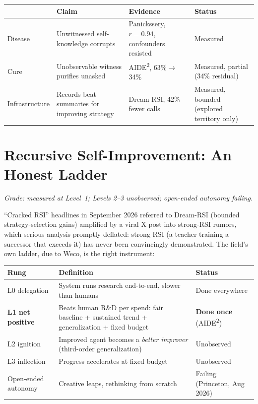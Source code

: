 \documentclass[11pt]{article}
\begin{document}
\begin{center}
\small
\begin{tabular}{p{2.2cm}p{3.8cm}p{3.8cm}p{2.6cm}}
\toprule
 & Claim & Evidence & Status \\
\midrule
Disease & Unwitnessed self-knowledge corrupts & Panickssery, $r=0.94$, confounders resisted & Measured \\
Cure & Unobservable witness purifies unasked & AIDE\textsuperscript{2}, 63\%$\to$34\% & Measured, partial (34\% residual) \\
Infrastructure & Records beat summaries for improving strategy & Dream-RSI, 42\% fewer calls & Measured, bounded (explored territory only) \\
\bottomrule
\end{tabular}
\end{center}

\section{Recursive Self-Improvement: An Honest Ladder}
\label{sec:rsi}

\textit{Grade: measured at Level~1; Levels 2--3 unobserved; open-ended autonomy failing.}

``Cracked RSI'' headlines in September 2026 referred to Dream-RSI (bounded strategy-selection gains) amplified by a viral X post into strong-RSI rumors, which serious analysis promptly deflated: strong RSI (a teacher training a successor that exceeds it) has never been convincingly demonstrated. The field's own ladder, due to Weco, is the right instrument:

\begin{center}
\small
\begin{tabular}{p{2.6cm}p{4.2cm}p{5.4cm}}
\toprule
Rung & Definition & Status \\
\midrule
L0 delegation & System runs research end-to-end, slower than humans & Done everywhere \\
\textbf{L1 net positive} & Beats human R\&D per spend: fair baseline + sustained trend + generalization + fixed budget & \textbf{Done once} (AIDE\textsuperscript{2}) \\
L2 ignition & Improved agent becomes a \emph{better improver} (third-order generalization) & Unobserved \\
L3 inflection & Progress accelerates at fixed budget & Unobserved \\
Open-ended autonomy & Creative leaps, rethinking from scratch & Failing (Princeton, Aug 2026) \\
\bottomrule
\end{tabular}
\end{center}
\end{document}
